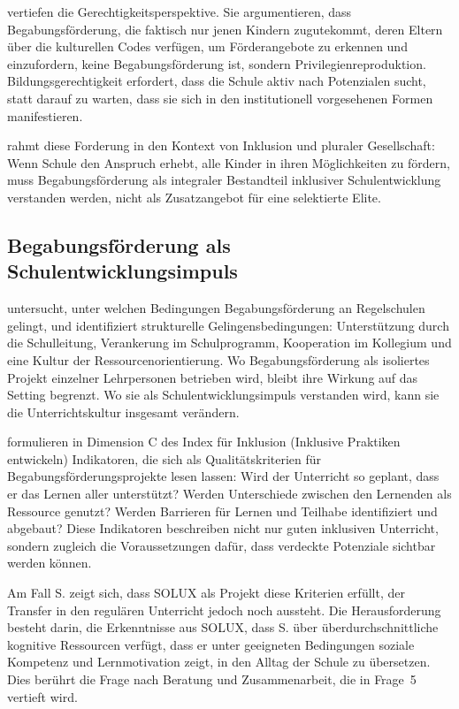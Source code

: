 \documentclass[ngerman, a4paper]{article}
\begin{document}
\textcite{sedmak2021bildungsgerechtigkeit} vertiefen die Gerechtigkeitsperspektive. Sie argumentieren, dass
Begabungsförderung, die faktisch nur jenen Kindern zugutekommt, deren Eltern über
die kulturellen Codes verfügen, um Förderangebote zu erkennen und einzufordern, keine
Begabungsförderung ist, sondern Privilegienreproduktion. Bildungsgerechtigkeit
erfordert, dass die Schule aktiv nach Potenzialen sucht, statt darauf zu warten,
dass sie sich in den institutionell vorgesehenen Formen manifestieren.

\textcite{muelleroppliger2021plurale} rahmt diese Forderung in den Kontext von Inklusion und pluraler
Gesellschaft: Wenn Schule den Anspruch erhebt, alle Kinder in ihren Möglichkeiten
zu fördern, muss Begabungsförderung als integraler Bestandteil inklusiver
Schulentwicklung verstanden werden, nicht als Zusatzangebot für eine selektierte
Elite.

\subsection{Begabungsförderung als Schulentwicklungsimpuls}

\textcite{unger2010begabungsfoerderung} untersucht, unter welchen Bedingungen Begabungsförderung an Regelschulen
gelingt, und identifiziert strukturelle Gelingensbedingungen: Unterstützung durch
die Schulleitung, Verankerung im Schulprogramm, Kooperation im Kollegium und
eine Kultur der Ressourcenorientierung. Wo Begabungsförderung als isoliertes
Projekt einzelner Lehrpersonen betrieben wird, bleibt ihre Wirkung auf das Setting
begrenzt. Wo sie als Schulentwicklungsimpuls verstanden wird, kann sie die
Unterrichtskultur insgesamt verändern.

\textcite{booth2019index} formulieren in Dimension C des Index für Inklusion (Inklusive
Praktiken entwickeln) Indikatoren, die sich als Qualitätskriterien für
Begabungsförderungsprojekte lesen lassen: Wird der Unterricht so geplant, dass er
das Lernen aller unterstützt? Werden Unterschiede zwischen den Lernenden als
Ressource genutzt? Werden Barrieren für Lernen und Teilhabe identifiziert und
abgebaut? Diese Indikatoren beschreiben nicht nur guten inklusiven Unterricht,
sondern zugleich die Voraussetzungen dafür, dass verdeckte Potenziale sichtbar
werden können.

Am Fall S. zeigt sich, dass SOLUX als Projekt diese Kriterien erfüllt, der Transfer
in den regulären Unterricht jedoch noch aussteht. Die Herausforderung besteht darin,
die Erkenntnisse aus SOLUX, dass S. über überdurchschnittliche kognitive Ressourcen
verfügt, dass er unter geeigneten Bedingungen soziale Kompetenz und Lernmotivation
zeigt, in den Alltag der Schule zu übersetzen. Dies berührt die Frage nach
Beratung und Zusammenarbeit, die in Frage~5 vertieft wird.
\end{document}
